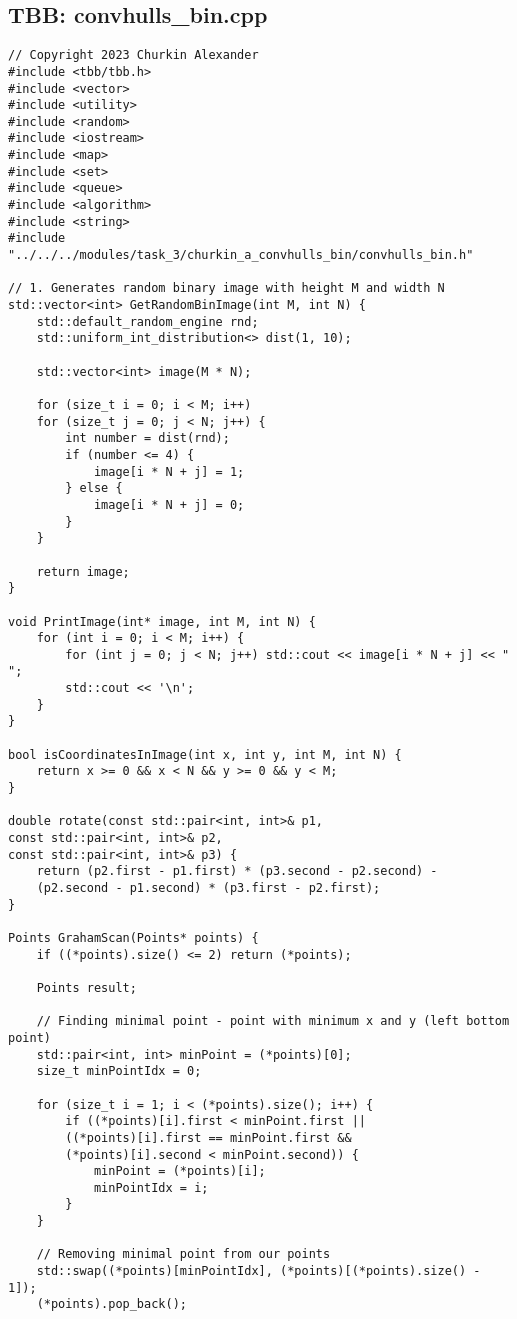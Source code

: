\documentclass[14pt, russian]{extarticle}
\begin{document}
	\subsection{TBB: convhulls\_bin.cpp}
	\begin{lstlisting}
// Copyright 2023 Churkin Alexander
#include <tbb/tbb.h>
#include <vector>
#include <utility>
#include <random>
#include <iostream>
#include <map>
#include <set>
#include <queue>
#include <algorithm>
#include <string>
#include "../../../modules/task_3/churkin_a_convhulls_bin/convhulls_bin.h"

// 1. Generates random binary image with height M and width N
std::vector<int> GetRandomBinImage(int M, int N) {
	std::default_random_engine rnd;
	std::uniform_int_distribution<> dist(1, 10);
	
	std::vector<int> image(M * N);
	
	for (size_t i = 0; i < M; i++)
	for (size_t j = 0; j < N; j++) {
		int number = dist(rnd);
		if (number <= 4) {
			image[i * N + j] = 1;
		} else {
			image[i * N + j] = 0;
		}
	}
	
	return image;
}

void PrintImage(int* image, int M, int N) {
	for (int i = 0; i < M; i++) {
		for (int j = 0; j < N; j++) std::cout << image[i * N + j] << " ";
		std::cout << '\n';
	}
}

bool isCoordinatesInImage(int x, int y, int M, int N) {
	return x >= 0 && x < N && y >= 0 && y < M;
}

double rotate(const std::pair<int, int>& p1,
const std::pair<int, int>& p2,
const std::pair<int, int>& p3) {
	return (p2.first - p1.first) * (p3.second - p2.second) -
	(p2.second - p1.second) * (p3.first - p2.first);
}

Points GrahamScan(Points* points) {
	if ((*points).size() <= 2) return (*points);
	
	Points result;
	
	// Finding minimal point - point with minimum x and y (left bottom point)
	std::pair<int, int> minPoint = (*points)[0];
	size_t minPointIdx = 0;
	
	for (size_t i = 1; i < (*points).size(); i++) {
		if ((*points)[i].first < minPoint.first ||
		((*points)[i].first == minPoint.first &&
		(*points)[i].second < minPoint.second)) {
			minPoint = (*points)[i];
			minPointIdx = i;
		}
	}
	
	// Removing minimal point from our points
	std::swap((*points)[minPointIdx], (*points)[(*points).size() - 1]);
	(*points).pop_back();
	

\end{lstlisting}
\end{document}
